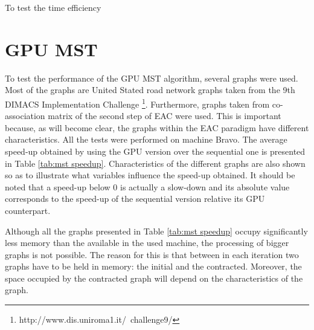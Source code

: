 To test the time efficiency 

%
%

\section{GPU MST}
\label{sec:gpu mst}


To test the performance of the GPU MST algorithm, several graphs were used.
Most of the graphs are United Stated road network graphs taken from the 9th DIMACS Implementation Challenge \footnote{http://www.dis.uniroma1.it/~challenge9/}.
Furthermore, graphs taken from co-association matrix of the second step of EAC were used.
This is important because, as will become clear, the graphs within the EAC paradigm have different characteristics.
All the tests were performed on machine Bravo.
The average speed-up obtained by using the GPU version over the sequential one is presented in Table \ref{tab:mst speedup}.
Characteristics of the different graphs are also shown so as to illustrate what variables influence the speed-up obtained.
It should be noted that a speed-up below 0 is actually a slow-down and its absolute value corresponds to the speed-up of the sequential version relative its GPU counterpart.



Although all the graphs presented in Table \ref{tab:mst speedup} occupy significantly less memory than the available in the used machine, the processing of bigger graphs is not possible.
The reason for this is that between in each iteration two graphs have to be held in memory: the initial and the contracted.
Moreover, the space occupied by the contracted graph will depend on the characteristics of the graph.

